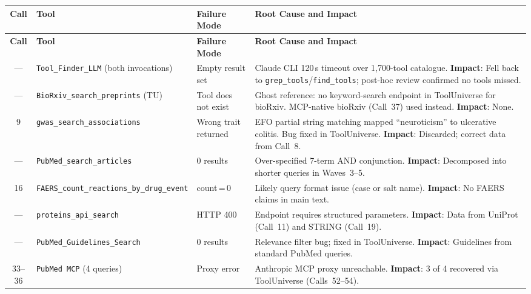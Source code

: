 {\small
\begin{longtable}{@{}c p{2.8cm} p{2.8cm} p{5.8cm}@{}}
\toprule
\textbf{Call} & \textbf{Tool} & \textbf{Failure Mode} &
\textbf{Root Cause and Impact} \\
\midrule
\endfirsthead
\toprule
\textbf{Call} & \textbf{Tool} & \textbf{Failure Mode} &
\textbf{Root Cause and Impact} \\
\midrule
\endhead
\bottomrule
\endlastfoot

--- &
\texttt{Tool\_Finder\_LLM} (both invocations) &
Empty result set &
Claude CLI 120\,s timeout over 1,700-tool catalogue.  \textbf{Impact}: Fell
back to \texttt{grep\_tools}/\texttt{find\_tools}; post-hoc review confirmed
no tools missed. \\
\midrule

--- &
\texttt{BioRxiv\_search\_\allowbreak preprints} (TU) &
Tool does not exist &
Ghost reference: no keyword-search endpoint in ToolUniverse for bioRxiv.
MCP-native bioRxiv (Call~37) used instead.  \textbf{Impact}: None. \\
\midrule

9 &
\texttt{gwas\_search\_\allowbreak associations} &
Wrong trait returned &
EFO partial string matching mapped ``neuroticism'' to ulcerative colitis.
Bug fixed in ToolUniverse.  \textbf{Impact}: Discarded; correct data from
Call~8. \\
\midrule

--- &
\texttt{PubMed\_search\_\allowbreak articles} &
0 results &
Over-specified 7-term AND conjunction.  \textbf{Impact}: Decomposed into
shorter queries in Waves~3--5. \\
\midrule

16 &
\texttt{FAERS\_count\_\allowbreak reactions\_by\_\allowbreak drug\_event} &
count\,=\,0 &
Likely query format issue (case or salt name).  \textbf{Impact}: No FAERS
claims in main text. \\
\midrule

--- &
\texttt{proteins\_api\_search} &
HTTP 400 &
Endpoint requires structured parameters.  \textbf{Impact}: Data from UniProt
(Call~11) and STRING (Call~19). \\
\midrule

--- &
\texttt{PubMed\_Guidelines\_\allowbreak Search} &
0 results &
Relevance filter bug; fixed in ToolUniverse.  \textbf{Impact}: Guidelines
from standard PubMed queries. \\
\midrule

33--36 &
\texttt{PubMed MCP} (4 queries) &
Proxy error &
Anthropic MCP proxy unreachable.  \textbf{Impact}: 3 of 4 recovered via
ToolUniverse (Calls~52--54). \\
\midrule


\end{longtable}}
